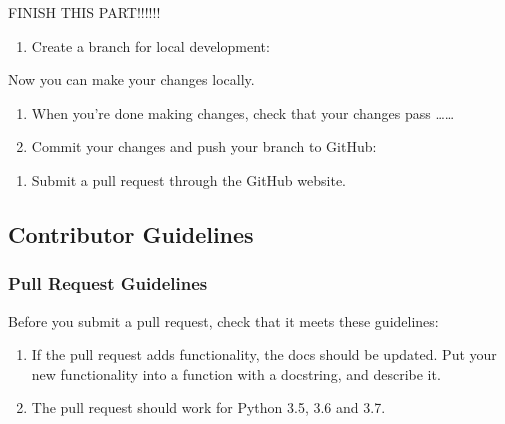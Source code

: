 \documentclass[letterpaper,10pt,english]{sphinxmanual}
\begin{document}
FINISH THIS PART!!!!!!
\begin{enumerate}
%
\setcounter{enumi}{3}
\item {} 
Create a branch for local development:

\end{enumerate}

Now you can make your changes locally.
\begin{enumerate}
%
\setcounter{enumi}{4}
\item {} 
When you’re done making changes, check that your changes pass ……

\item {} 
Commit your changes and push your branch to GitHub:

\end{enumerate}
\begin{enumerate}
%
\setcounter{enumi}{6}
\item {} 
Submit a pull request through the GitHub website.

\end{enumerate}


\subsection{Contributor Guidelines}
\label{\detokenize{MANIFEST:contributor-guidelines}}

\subsubsection{Pull Request Guidelines}
\label{\detokenize{MANIFEST:pull-request-guidelines}}
Before you submit a pull request, check that it meets these guidelines:
\begin{enumerate}
%
\item {} 
If the pull request adds functionality, the docs should be updated. Put your new functionality into a function with a docstring, and describe it.

\item {} 
The pull request should work for Python 3.5, 3.6 and 3.7.

\end{enumerate}
\end{document}
